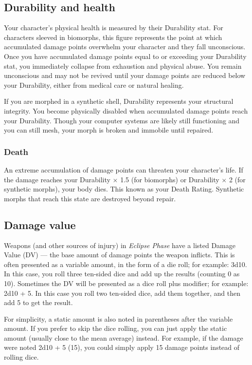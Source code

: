 \subsection{Durability and health} \label{sec:durability-health} 

Your character’s physical health is measured by their Durability stat. For characters sleeved in biomorphs, this figure represents the point at which accumulated damage points overwhelm your character and they fall unconscious. Once you have accumulated damage points equal to or exceeding your Durability stat, you immediately collapse from exhaustion and physical abuse. You remain unconscious and may not be revived until your damage points are reduced below your Durability, either from medical care or natural healing. 

If you are morphed in a synthetic shell, Durability represents your structural integrity. You become physically disabled when accumulated damage points reach your Durability. Though your computer systems are likely still functioning and you can still mesh, your morph is broken and immobile until repaired. 



\subsubsection{Death} 

An extreme accumulation of damage points can threaten your character’s life. If the damage reaches your Durability $\times$ 1.5 (for biomorphs) or Durability $\times$ 2 (for synthetic morphs), your body dies. This known as your Death Rating. Synthetic morphs that reach this state are destroyed beyond repair. 

\subsection{Damage value} 

Weapons (and other sources of injury) in \emph{Eclipse Phase} have a listed Damage Value (DV) --- the base amount of damage points the weapon inflicts. This is often presented as a variable amount, in the form of a die roll; for example: 3d10. In this case, you roll three ten-sided dice and add up the results (counting 0 as 10). Sometimes the DV will be presented as a dice roll plus modifier; for example: 2d10 + 5. In this case you roll two ten-sided dice, add them together, and then add 5 to get the result. 

For simplicity, a static amount is also noted in parentheses after the variable amount. If you prefer to skip the dice rolling, you can just apply the static amount (usually close to the mean average) instead. For example, if the damage were noted 2d10 + 5 (15), you could simply apply 15 damage points instead of rolling dice. 

